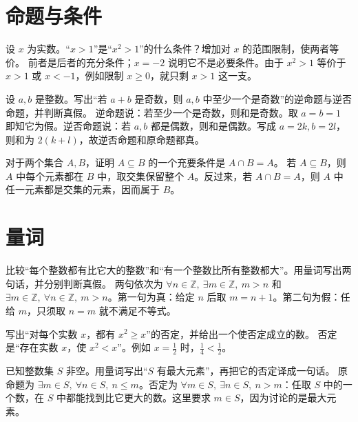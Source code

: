 \section{命题与条件}

设 \(x\) 为实数。“\(x>1\)”是“\(x^2>1\)”的什么条件？增加对 \(x\) 的范围限制，使两者等价。
\solutionanswer
前者是后者的充分条件；\(x=-2\) 说明它不是必要条件。由于 \(x^2>1\) 等价于 \(x>1\) 或 \(x<-1\)，例如限制 \(x\geq0\)，就只剩 \(x>1\) 这一支。

设 \(a,b\) 是整数。写出“若 \(a+b\) 是奇数，则 \(a,b\) 中至少一个是奇数”的逆命题与逆否命题，并判断真假。
\solutionanswer
逆命题说：若至少一个是奇数，则和是奇数。取 \(a=b=1\) 即知它为假。逆否命题说：若 \(a,b\) 都是偶数，则和是偶数。写成 \(a=2k,b=2l\)，则和为 \(2(k+l)\)，故逆否命题和原命题都真。

对于两个集合 \(A,B\)，证明 \(A\subseteq B\) 的一个充要条件是 \(A\cap B=A\)。
\solutionanswer
若 \(A\subseteq B\)，则 \(A\) 中每个元素都在 \(B\) 中，取交集保留整个 \(A\)。反过来，若 \(A\cap B=A\)，则 \(A\) 中任一元素都是交集的元素，因而属于 \(B\)。

\section{量词}

比较“每个整数都有比它大的整数”和“有一个整数比所有整数都大”。用量词写出两句话，并分别判断真假。
\solutionanswer
两句依次为 \(\forall n\in\mathbb Z,\ \exists m\in\mathbb Z,\ m>n\) 和 \(\exists m\in\mathbb Z,\ \forall n\in\mathbb Z,\ m>n\)。第一句为真：给定 \(n\) 后取 \(m=n+1\)。第二句为假：任给 \(m\)，只须取 \(n=m\) 就不满足不等式。

写出“对每个实数 \(x\)，都有 \(x^2\geq x\)”的否定，并给出一个使否定成立的数。
\solutionanswer
否定是“存在实数 \(x\)，使 \(x^2<x\)”。例如 \(x=\tfrac12\) 时，\(\tfrac14<\tfrac12\)。

已知整数集 \(S\) 非空。用量词写出“\(S\) 有最大元素”，再把它的否定译成一句话。
\solutionanswer
原命题为 \(\exists m\in S,\ \forall n\in S,\ n\le m\)。否定为 \(\forall m\in S,\ \exists n\in S,\ n>m\)：任取 \(S\) 中的一个数，在 \(S\) 中都能找到比它更大的数。这里要求 \(m\in S\)，因为讨论的是最大元素。

